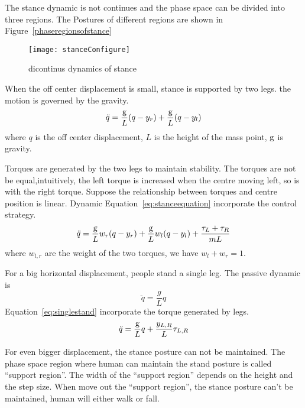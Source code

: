 The stance dynamic is not continues and the phase space can be divided into three regions.
The Postures of different regions are shown in Figure~\ref{phaseregionsofstance}

\begin{figure}[!htbp]
  \begin{center}
     \texttt{[image: stanceConfigure]}
    \caption{dicontinus dynamics of stance}
    \label{fig:phaseregionsofstance}
\end{center}
\end{figure}


\begin{itemize}
When the off center  displacement  is small, stance is supported by two legs.
the motion is governed by the gravity.
\[
\ddot{q}=\frac{\mathrm{g}}{L}(q-y_r)+\frac{\mathrm{g}}{L}(q-y_l)
\]
where $q$ is the off center displacement,
$L$ is the height of the mass point,
$\mathrm{g}$ is gravity.



Torques are generated by the two legs to maintain stability.
The torques are not be equal,intuitively, the left torque is increased when the centre moving left, so is with the right torque.
Suppose the relationship between torques and centre position is linear.
Dynamic Equation~\ref{eq:stanceequation} incorporate the control strategy.
\begin{equation}
\label{eq:stanceequation}
\ddot{q}=\frac{\mathrm{g}}{L}w_r(q-y_r)+\frac{\mathrm{g}}{L}w_l(q-y_l)+\frac{\tau_L+\tau_R}{mL}
\end{equation}
where $w_{l,r}$ are the weight of the two torques, we have $w_l+w_r=1$.


For a big horizontal  displacement,  people stand a single leg.
The passive dynamic is
\[
\ddot{q}=\frac{g}{L}q
\]
Equation~\ref{eq:singlestand} incorporate the torque generated by legs.
\begin{equation}
\label{eq:singlestand}
\ddot{q}=\frac{\mathrm{g}}{L}q+\frac{y_{L,R}}{L}\tau_{L,R}
\end{equation}

For even bigger displacement,  the stance posture can not be maintained.
The phase space region where human can maintain the stand posture is called ``support region''.
The width of the ``support region'' depends on the  height and the step size.
When move out the ``support region'', the stance posture can't be maintained, human will either walk or fall.
\end{itemize}







